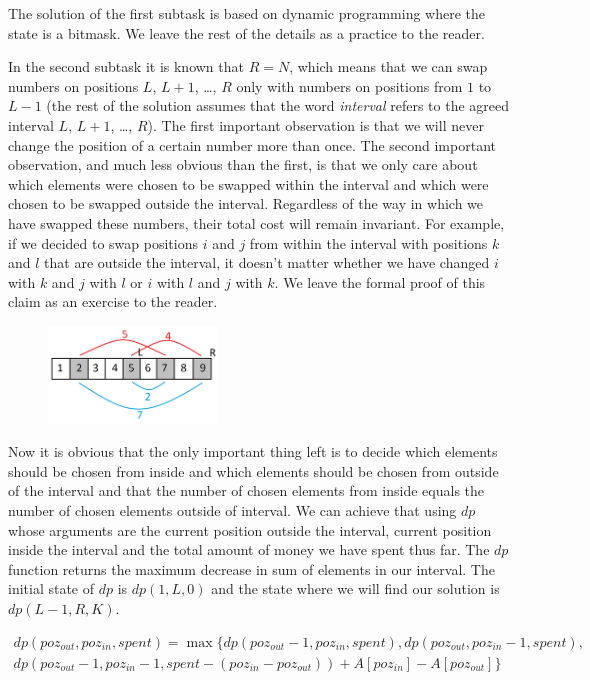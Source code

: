 \documentclass[a4paper]{article}
\begin{document}
The solution of the first subtask is based on dynamic programming where the
state is a bitmask. We leave the rest of the details as a practice to the reader.

In the second subtask it is known that $R = N$, which means that we can swap
numbers on positions $L$, $L+1$, \dots, $R$ only with numbers on positions from
$1$ to $L-1$ (the rest of the solution assumes that the word \textit{interval}
refers to the agreed interval $L$, $L+1$, \dots, $R$). The first important observation
is that we will never change the position of a certain number more than once. The
second important observation, and much less obvious than the first, is that we
only care about which elements were chosen to be swapped within the interval and which were
chosen to be swapped outside the interval. Regardless of the way in which we have
swapped these numbers, their total cost will remain invariant. For example, if we
decided to swap positions $i$ and $j$ from within the interval with positions $k$
and $l$ that are outside the interval, it doesn't matter whether we have changed
$i$ with $k$ and $j$ with $l$ or $i$ with $l$ and $j$ with $k$. We leave the
formal proof of this claim as an exercise to the reader.

\begin{figure}[!htbp]
\centering
\includegraphics[width=0.4\textwidth]{editorial_holding.png}
\end{figure}

Now it is obvious that the only important thing left is to decide which elements
should be chosen from inside and which elements should be chosen from outside
of the interval and that the number of chosen elements from inside equals the
number of chosen elements outside of interval. We can achieve that using $dp$
whose arguments are the current position outside the interval, current position
inside the interval and the total amount of money we have spent thus far. The
$dp$ function returns the maximum decrease in sum of elements in our interval.
The initial state of $dp$ is $dp(1, L, 0)$ and the state where we will find our
solution is $dp(L - 1, R, K)$.

\begin{multline}
  dp(poz_{out}, poz_{in}, spent) = \max \biggl\{ dp(poz_{out} - 1, poz_{in}, spent),
  dp(poz_{out}, poz_{in} - 1, spent),\\
  dp(poz_{out} - 1, poz_{in} - 1, spent - (poz_{in} - poz_{out})) + A[poz_{in}] - A[poz_{out}] \biggr\}
\end{multline}
\end{document}
